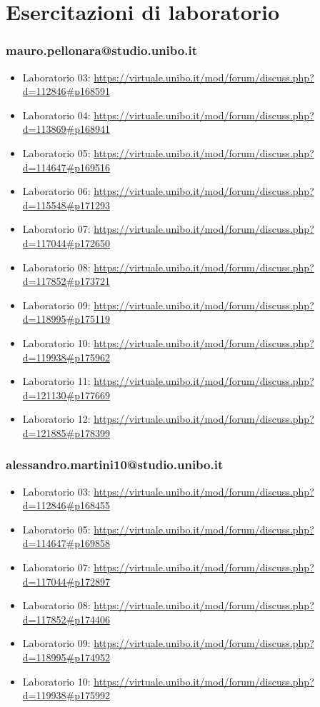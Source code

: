 \section{Esercitazioni di laboratorio}
\subsubsection*{mauro.pellonara@studio.unibo.it}
\begin{itemize}
    \item Laboratorio 03: \url{https://virtuale.unibo.it/mod/forum/discuss.php?d=112846#p168591}
    \item Laboratorio 04: \url{https://virtuale.unibo.it/mod/forum/discuss.php?d=113869#p168941}
    \item Laboratorio 05: \url{https://virtuale.unibo.it/mod/forum/discuss.php?d=114647#p169516}
    \item Laboratorio 06: \url{https://virtuale.unibo.it/mod/forum/discuss.php?d=115548#p171293}
    \item Laboratorio 07: \url{https://virtuale.unibo.it/mod/forum/discuss.php?d=117044#p172650}
    \item Laboratorio 08: \url{https://virtuale.unibo.it/mod/forum/discuss.php?d=117852#p173721}
    \item Laboratorio 09: \url{https://virtuale.unibo.it/mod/forum/discuss.php?d=118995#p175119}
    \item Laboratorio 10: \url{https://virtuale.unibo.it/mod/forum/discuss.php?d=119938#p175962}
    \item Laboratorio 11: \url{https://virtuale.unibo.it/mod/forum/discuss.php?d=121130#p177669}
    \item Laboratorio 12: \url{https://virtuale.unibo.it/mod/forum/discuss.php?d=121885#p178399}
\end{itemize}

\subsubsection*{alessandro.martini10@studio.unibo.it}
\begin{itemize}
    \item Laboratorio 03: \url{https://virtuale.unibo.it/mod/forum/discuss.php?d=112846#p168455}
    \item Laboratorio 05: \url{https://virtuale.unibo.it/mod/forum/discuss.php?d=114647#p169858}
    \item Laboratorio 07: \url{https://virtuale.unibo.it/mod/forum/discuss.php?d=117044#p172897}
    \item Laboratorio 08: \url{https://virtuale.unibo.it/mod/forum/discuss.php?d=117852#p174406}
    \item Laboratorio 09: \url{https://virtuale.unibo.it/mod/forum/discuss.php?d=118995#p174952}
    \item Laboratorio 10: \url{https://virtuale.unibo.it/mod/forum/discuss.php?d=119938#p175992}
\end{itemize}


